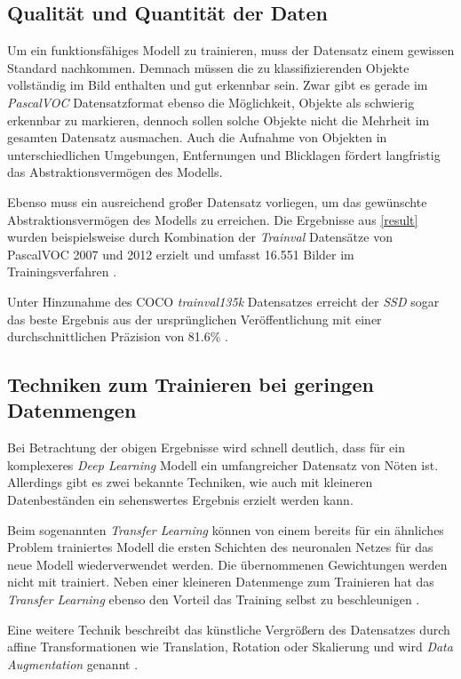 \subsection*{Qualität und Quantität der Daten}

Um ein funktionsfähiges Modell zu trainieren, muss der Datensatz einem gewissen Standard nachkommen. Demnach müssen die zu klassifizierenden Objekte vollständig im Bild enthalten und gut erkennbar sein. Zwar gibt es gerade im \textit{PascalVOC} Datensatzformat ebenso die Möglichkeit, Objekte als \glqq schwierig erkennbar\grqq{} zu markieren, dennoch sollen solche Objekte nicht die Mehrheit im gesamten Datensatz ausmachen. Auch die Aufnahme von Objekten in unterschiedlichen Umgebungen, Entfernungen und Blicklagen fördert langfristig das Abstraktionsvermögen des Modells. 

Ebenso muss ein ausreichend großer Datensatz vorliegen, um das gewünschte Abstraktionsvermögen des Modells zu erreichen. Die Ergebnisse aus \ref{result} wurden beispielsweise durch Kombination der \textit{Trainval} Datensätze von PascalVOC 2007 und 2012 erzielt und umfasst 16.551 Bilder im Trainingsverfahren \cite{ssd.20161229} \cite{MarkEveringham.20070607} \cite{MarkEveringham.20120521}. 

Unter Hinzunahme des COCO \textit{trainval135k} Datensatzes erreicht der \textit{SSD} sogar das beste Ergebnis aus der ursprünglichen Veröffentlichung mit einer durchschnittlichen Präzision von 81.6\% \cite{ssd.20161229}. 

\subsection*{Techniken zum Trainieren bei geringen Datenmengen}

Bei Betrachtung der obigen Ergebnisse wird schnell deutlich, dass für ein komplexeres \textit{Deep Learning} Modell ein umfangreicher Datensatz von Nöten ist. Allerdings gibt es zwei bekannte Techniken, wie auch mit kleineren Datenbeständen ein sehenswertes Ergebnis erzielt werden kann. 

Beim sogenannten \textit{Transfer Learning} können von einem bereits für ein ähnliches Problem trainiertes Modell die ersten Schichten des neuronalen Netzes für das neue Modell wiederverwendet werden. Die übernommenen Gewichtungen werden nicht mit trainiert. Neben einer kleineren Datenmenge zum Trainieren hat das \textit{Transfer Learning} ebenso den Vorteil das Training selbst zu beschleunigen \cite{AurelienGeron.2018}.

Eine weitere Technik beschreibt das künstliche Vergrößern des Datensatzes durch affine Transformationen wie Translation, Rotation oder Skalierung und wird \textit{Data Augmentation} genannt \cite{AurelienGeron.2018}.
